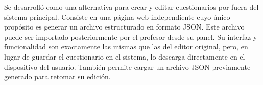 
Se desarrolló como una alternativa para crear y editar cuestionarios por fuera del sistema principal. Consiste en una página web independiente cuyo único propósito es generar un archivo estructurado en formato JSON. Este archivo puede ser importado posteriormente por el profesor desde su panel. Su interfaz y funcionalidad son exactamente las mismas que las del editor original, pero, en lugar de guardar el cuestionario en el sistema, lo descarga directamente en el dispositivo del usuario. También permite cargar un archivo JSON previamente generado para retomar su edición.




